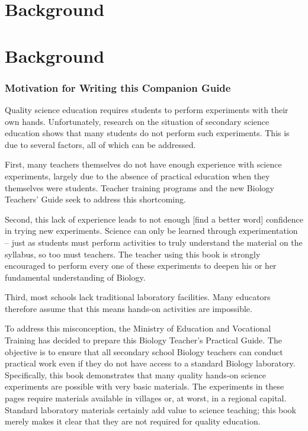 \chapter*{Background}

\chapter*{Background}

\subsection{Motivation for Writing this Companion Guide}

Quality science education requires students to perform experiments with their own hands. Unfortunately, research on the situation of secondary science education shows that many students do not perform such experiments. This is due to several factors, all of which can be addressed.

First, many teachers themselves do not have enough experience with science experiments, largely due to the absence of practical education when they themselves were students. Teacher training programs and the new Biology Teachers' Guide seek to address this shortcoming.

Second, this lack of experience leads to not enough [find a better word] confidence in trying new experiments. Science can only be learned through experimentation -- just as students must perform activities to truly understand the material on the syllabus, so too must teachers. The teacher using this book is strongly encouraged to perform every one of these experiments to deepen his or her fundamental understanding of Biology.

Third, most schools lack traditional laboratory facilities. Many educators therefore assume that this means hands-on activities are impossible.

To address this misconception, the Ministry of Education and Vocational Training has decided to prepare this Biology Teacher's Practical Guide. The objective is to ensure that all secondary school Biology teachers can conduct practical work even if they do not have access to a standard Biology laboratory. Specifically, this book demonstrates that many quality hands-on science experiments are possible with very basic materials. The experiments in these pages require materials available in villages or, at worst, in a regional capital. Standard laboratory materials certainly add value to science teaching; this book merely makes it clear that they are not required for quality education.


